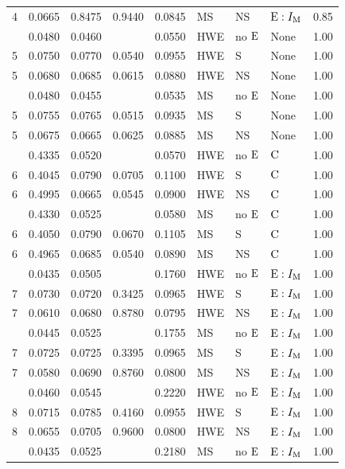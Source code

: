 \begin{longtable}[t]{lllllllll}
4 & 0.0665 & 0.8475 & 0.9440 & 0.0845 & MS & NS & ${\rm E}:I_{{\rm M}}$ & 0.85\\
\addlinespace
5 & 0.0480 & 0.0460 &  & 0.0550 & HWE & no ${\rm E}$ & None & 1.00\\
5 & 0.0750 & 0.0770 & 0.0540 & 0.0955 & HWE & S & None & 1.00\\
5 & 0.0680 & 0.0685 & 0.0615 & 0.0880 & HWE & NS & None & 1.00\\
\addlinespace
5 & 0.0480 & 0.0455 &  & 0.0535 & MS & no ${\rm E}$ & None & 1.00\\
5 & 0.0755 & 0.0765 & 0.0515 & 0.0935 & MS & S & None & 1.00\\
5 & 0.0675 & 0.0665 & 0.0625 & 0.0885 & MS & NS & None & 1.00\\
\addlinespace
6 & 0.4335 & 0.0520 &  & 0.0570 & HWE & no ${\rm E}$ & ${\rm C}$ & 1.00\\
6 & 0.4045 & 0.0790 & 0.0705 & 0.1100 & HWE & S & ${\rm C}$ & 1.00\\
6 & 0.4995 & 0.0665 & 0.0545 & 0.0900 & HWE & NS & ${\rm C}$ & 1.00\\
\addlinespace
6 & 0.4330 & 0.0525 &  & 0.0580 & MS & no ${\rm E}$ & ${\rm C}$ & 1.00\\
6 & 0.4050 & 0.0790 & 0.0670 & 0.1105 & MS & S & ${\rm C}$ & 1.00\\
6 & 0.4965 & 0.0685 & 0.0540 & 0.0890 & MS & NS & ${\rm C}$ & 1.00\\
\addlinespace
7 & 0.0435 & 0.0505 &  & 0.1760 & HWE & no ${\rm E}$ & ${\rm E}:I_{{\rm M}}$ & 1.00\\
7 & 0.0730 & 0.0720 & 0.3425 & 0.0965 & HWE & S & ${\rm E}:I_{{\rm M}}$ & 1.00\\
7 & 0.0610 & 0.0680 & 0.8780 & 0.0795 & HWE & NS & ${\rm E}:I_{{\rm M}}$ & 1.00\\
\addlinespace
7 & 0.0445 & 0.0525 &  & 0.1755 & MS & no ${\rm E}$ & ${\rm E}:I_{{\rm M}}$ & 1.00\\
7 & 0.0725 & 0.0725 & 0.3395 & 0.0965 & MS & S & ${\rm E}:I_{{\rm M}}$ & 1.00\\
7 & 0.0580 & 0.0690 & 0.8760 & 0.0800 & MS & NS & ${\rm E}:I_{{\rm M}}$ & 1.00\\
\addlinespace
8 & 0.0460 & 0.0545 &  & 0.2220 & HWE & no ${\rm E}$ & ${\rm E}:I_{{\rm M}}$ & 1.00\\
8 & 0.0715 & 0.0785 & 0.4160 & 0.0955 & HWE & S & ${\rm E}:I_{{\rm M}}$ & 1.00\\
8 & 0.0655 & 0.0705 & 0.9600 & 0.0800 & HWE & NS & ${\rm E}:I_{{\rm M}}$ & 1.00\\
\addlinespace
8 & 0.0435 & 0.0525 &  & 0.2180 & MS & no ${\rm E}$ & ${\rm E}:I_{{\rm M}}$ & 1.00\\

\end{longtable}
